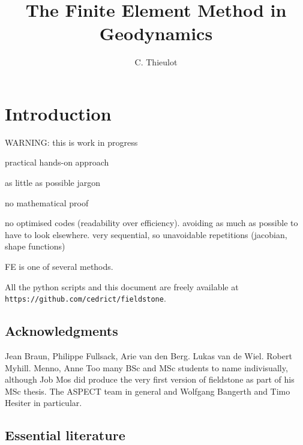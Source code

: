 \documentclass[a4paper]{article}
\title{The Finite Element Method in Geodynamics}
\author{C. Thieulot}
\begin{document}
\maketitle

\tableofcontents

\newpage
\section{Introduction}

{\color{red} \huge WARNING: this is work in progress}

practical hands-on approach

as little as possible jargon

no mathematical proof

no optimised codes (readability over efficiency). avoiding as much as possible to have to look elsewhere.
very sequential, so unavoidable repetitions (jacobian, shape functions)

FE is one of several methods.

All the python scripts and this document are freely available at {\tt https://github.com/cedrict/fieldstone}.

\subsection{Acknowledgments}

Jean Braun, Philippe Fullsack, Arie van den Berg.
Lukas van de Wiel. Robert Myhill.
Menno, Anne
Too many BSc and MSc students to name indivisually, although Job Mos did produce the
very first version of fieldstone as part of his MSc thesis.
The ASPECT team in general and Wolfgang Bangerth and Timo Hesiter in particular.

\subsection{Essential literature}
\end{document}
